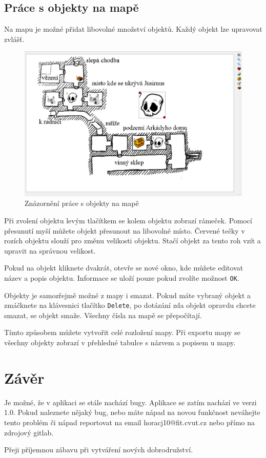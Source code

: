 \documentclass[12pt,a4paper,oneside]{article}
\begin{document}
	\subsection{Práce s objekty na mapě}
	Na mapu je možné přidat libovolné množství objektů. Každý objekt lze upravovat zvlášť.
	\begin{figure}[h]
  		\centering  		
    		\includegraphics[width=1\linewidth]{images/map_objekty}
    		\caption{Znázornění práce s objekty na mapě}
    		\label{fig:editace_strom_another}  	  		
  		\vfill
	\end{figure}
	
	Při zvolení objektu levým tlačítkem se kolem objektu zobrazí rámeček. Pomocí přesunutí myší můžete objekt přesunout na libovolné místo. Červené tečky v rozích objektu slouží pro změnu velikosti objektu. Stačí objekt za tento roh vzít a upravit na správnou velikost. \par

	Pokud na objekt kliknete dvakrát, otevře se nové okno, kde můžete editovat název a popis objektu. Informace se uloží pouze pokud zvolíte možnost \texttt{OK}. \par
	
	Objekty je samozřejmě možné z mapy i smazat. Pokud máte vybraný objekt a zmáčknete na klávesnici tlačítko \texttt{Delete}, po dotázání zda objekt opravdu chcete smazat, se objekt smaže.  Všechny čísla na mapě se přepočítají. \par
	
	Tímto způsobem můžete vytvořit celé rozložení mapy. Při exportu mapy se všechny objekty zobrazí v přehledné tabulce s názvem a popisem u mapy. 
	
	
	\section{Závěr}
	
Je možné, že v aplikaci se stále nachází bugy. Aplikace se zatím nachází ve verzi 1.0. Pokud naleznete nějaký bug, nebo máte nápad na novou funkčnost neváhejte tento problém či nápad reportovat na email horacj10@fit.cvut.cz nebo přímo na zdrojový gitlab. \par

Přeji příjemnou zábavu při vytváření nových dobrodružství.
\end{document}
